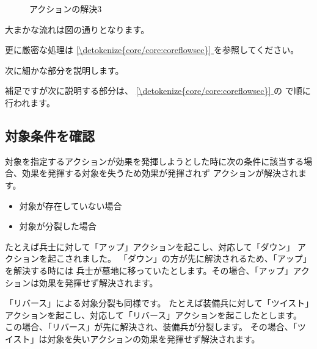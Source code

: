 \documentclass[letterpaper,10pt,dvipdfmx]{sphinxmanual}
\begin{document}
\begin{figure}[htbp]
\centering
\capstart

\noindent{}
\caption{アクションの解決3}\label{\detokenize{common/common-action:id22}}\label{\detokenize{common/common-action:action-request3-image}}\end{figure}

\sphinxAtStartPar
大まかな流れは図の通りとなります。

\sphinxAtStartPar
更に厳密な処理は \hyperref[\detokenize{core/core:coreflowsec}]{\ref{\detokenize{core/core:coreflowsec}} } を参照してください。

\sphinxAtStartPar
次に細かな部分を説明します。

\sphinxAtStartPar
補足ですが次に説明する部分は、 \hyperref[\detokenize{core/core:coreflowsec}]{\ref{\detokenize{core/core:coreflowsec}} } の {\hyperref[\detokenize{core/core:actresolve}]{}} で順に行われます。


\subsection{対象条件を確認}
\label{\detokenize{common/common-action:id10}}
\sphinxAtStartPar
対象を指定するアクションが効果を発揮しようとした時に次の条件に該当する場合、効果を発揮する対象を失うため効果が発揮されず
アクションが解決されます。
\begin{itemize}
\item {} 
\sphinxAtStartPar
対象が存在していない場合

\item {} 
\sphinxAtStartPar
対象が分裂した場合

\end{itemize}

\sphinxAtStartPar
たとえば兵士に対して「アップ」アクションを起こし、対応して「ダウン」
アクションを起こされました。
「ダウン」の方が先に解決されるため、「アップ」を解決する時には
兵士が墓地に移っていたとします。その場合、「アップ」アクションは効果を発揮せず解決されます。

\sphinxAtStartPar
「リバース」による対象分裂も同様です。
たとえば装備兵に対して「ツイスト」アクションを起こし、対応して「リバース」アクションを起こしたとします。
この場合、「リバース」が先に解決され、装備兵が分裂します。
その場合、「ツイスト」は対象を失いアクションの効果を発揮せず解決されます。
\end{document}
